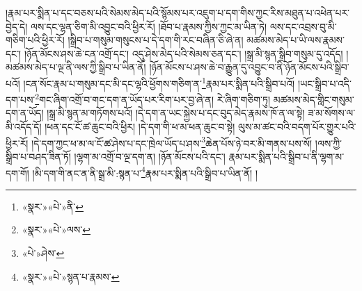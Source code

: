 །རྣམ་པར་སྨིན་པ་དང་བཅས་པའི་སེམས་མེད་པའི་སྙོམས་པར་འཇུག་པ་དག་གིས་ཀྱང་རིས་མཐུན་པ་འཕེན་པར་བྱེད་དེ། ལས་དང་ལྷན་ཅིག་མི་འབྱུང་བའི་ཕྱིར་རོ། །ཐོབ་པ་རྣམས་ཀྱིས་ཀྱང་མ་ཡིན་ཏེ། ལས་དང་འབྲས་བུ་མི་གཅིག་པའི་ཕྱིར་རོ། །སྒྲིབ་པ་གསུམ་གསུངས་པ་དེ་དག་གི་རང་བཞིན་ཅི་ཞེ་ན། མཚམས་མེད་པ་ཡི་ལས་རྣམས་དང་། །ཉོན་མོངས་ཤས་ཆེ་ངན་འགྲོ་དང་། འདུ་ཤེས་མེད་པའི་སེམས་ཅན་དང་། །སྒྲ་མི་སྙན་སྒྲིབ་གསུམ་དུ་འདོད། །མཚམས་མེད་པ་ལྔ་ནི་ལས་ཀྱི་སྒྲིབ་པ་ཡིན་ནོ། །ཉོན་མོངས་པ་ཤས་ཆེ་བ་རྒྱུན་དུ་འབྱུང་བ་ནི་ཉོན་མོངས་པའི་སྒྲིབ་པའོ། །ངན་སོང་རྣམ་པ་གསུམ་དང་མི་དང་ལྷའི་ཕྱོགས་གཅིག་ན་\footnote{«སྣར་»«པེ་»ནི་}རྣམ་པར་སྨིན་པའི་སྒྲིབ་པའོ། །ཡང་སྒྲིབ་པ་འདི་དག་པས་\footnote{«སྣར་»«པེ་»ལས་}གང་ཞིག་འགྲོ་བ་གང་དག་ན་ཡོད་པར་རིག་པར་བྱ་ཞེ་ན། རེ་ཞིག་གཅིག་ཏུ། མཚམས་མེད་གླིང་གསུམ་དག་ན་ཡོད། །སྒྲ་མི་སྙན་མ་གཏོགས་པའོ། །དེ་དག་ན་ཡང་སྐྱེས་པ་དང་བུད་མེད་རྣམས་ཁོ་ན་ལ་སྟེ། ཟ་མ་སོགས་ལ་མི་འདོད་དོ། །ཕན་དང་ངོ་ཚ་ཆུང་བའི་ཕྱིར། །དེ་དག་གི་ཕ་མ་ཕན་ཆུང་བ་སྟེ། ལུས་མ་ཚང་བའི་བདག་པོར་གྱུར་པའི་ཕྱིར་རོ། །དེ་དག་ཀྱང་ཕ་མ་ལ་ངོ་ཚ་ཤེས་པ་དང་ཁྲེལ་ཡོད་པ་ཤས་\footnote{«པེ་»ཤེས་}ཆེན་པོས་ཉེ་བར་མི་གནས་པས་སོ། །ལས་ཀྱི་སྒྲིབ་པ་བཤད་ཟིན་ཏོ། །ལྷག་མ་འགྲོ་བ་ལྔ་དག་ན། །ཉོན་མོངས་པའི་དང་། རྣམ་པར་སྨིན་པའི་སྒྲིབ་པ་ནི་ལྷག་མ་དག་གོ། །མི་དག་གི་ནང་ན་ནི་སྒྲ་མི་:སྙན་པ་\footnote{«སྣར་»«པེ་»སྙན་པ་རྣམས་}རྣམ་པར་སྨིན་པའི་སྒྲིབ་པ་ཡིན་ནོ། །
